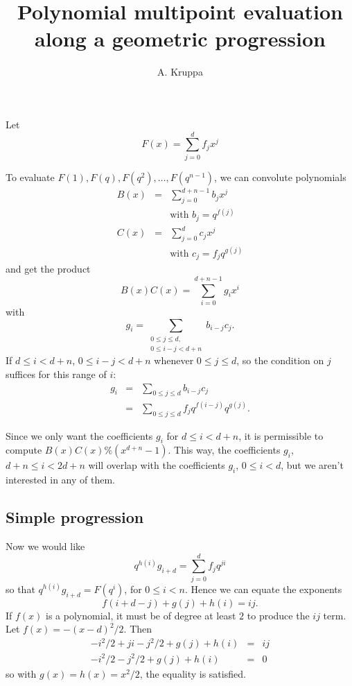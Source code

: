 \documentclass{article}
\begin{document}
\title{Polynomial multipoint evaluation along a geometric progression}
\author{A. Kruppa}
\maketitle

Let
\begin{displaymath}
F(x) = \sum_{j=0}^d f_j x^j
\end{displaymath}

To evaluate $F(1), F(q), F(q^2), \ldots ,F(q^{n-1})$, we can convolute 
polynomials
\begin{eqnarray*}
B(x) & = & \sum_{j=0}^{d + n -1} b_j x^j \\
     &   & \textrm{with } b_j = q^{f(j)}\\
C(x) & = & \sum_{j=0}^d c_j x^j \\
     &   & \textrm{with } c_j = f_j q^{g(j)}
\end{eqnarray*}
and get the product
\begin{displaymath}
B(x)C(x) = \sum_{i=0}^{d+n-1} g_i x^i
\end{displaymath}
with
\begin{displaymath}
g_i = \sum_{\substack{0\leq j\leq d,\\0\leq i-j < d+n}} b_{i-j} c_{j}.
\end{displaymath}
If $d \leq i < d+n$, $0 \leq i-j < d+n$ whenever $0\leq j\leq d$, 
so the condition on $j$ suffices for this range of $i$:
\begin{eqnarray*}
g_i & = & \sum_{0\leq j\leq d} b_{i-j} c_j \\
    & = & \sum_{0\leq j\leq d} f_j q^{f(i-j)} q^{g(j)}.
\end{eqnarray*}

Since we only want the coefficients $g_i$ for $d\leq i < d+n$, it is
permissible to compute $B(x)C(x) \% (x^{d+n}-1)$. This way, the coefficients
$g_i$, $d+n \leq i < 2d + n$ will overlap with the coefficients $g_i$, 
$0 \leq i < d$, but we aren't interested in any of them.


\subsection{Simple progression}
Now we would like 
\begin{displaymath}
q^{h(i)} g_{i+d} =  \sum_{j=0}^{d} f_j q^{ji}
\end{displaymath}
so that $q^{h(i)} g_{i+d} = F(q^i)$, for $0 \leq i < n$.
%
Hence we can equate the exponents
\begin{displaymath}
  f(i+d-j) + g(j) + h(i) = ij.
\end{displaymath}
If $f(x)$ is a polynomial, it must be of degree at least $2$ to produce the 
$ij$ term. Let $f(x)=-(x-d)^2/2$. Then 
\begin{eqnarray*}
  -i^2/2 + ji - j^2/2 + g(j) + h(i) & = & ij \\
  -i^2/2 - j^2/2 + g(j) + h(i) & = & 0
\end{eqnarray*}
so with $g(x) = h(x) = x^2/2$, the equality is satisfied.
\end{document}
